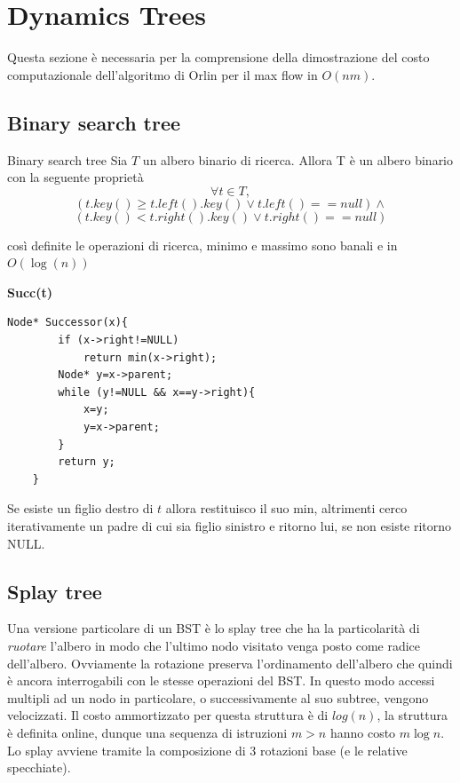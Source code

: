 \documentclass[a4paper, 11pt]{report}
\begin{document}
\section{Dynamics Trees}
    Questa sezione è necessaria per la comprensione della dimostrazione del costo computazionale dell'algoritmo di Orlin per il max flow in $O(nm)$.
    \subsection*{Binary search tree}
    \begin{definition}{Binary search tree}{}
        Sia $T$ un albero binario di ricerca.
        Allora T è un albero binario con la seguente proprietà
        \[\forall t \in T,\]\[ (t.key() \ge t.left().key() \lor t.left() == null)\land \]\[ (t.key() < t.right().key()\lor t.right() == null) \]
    \end{definition}
    così definite le operazioni di ricerca, minimo e massimo sono banali e in $O(\log(n))$
    
    \textbf{Succ(t)} 
    \begin{lstlisting}[style=customcpp]
    Node* Successor(x){ 
        if (x->right!=NULL) 
            return min(x->right); 
        Node* y=x->parent; 
        while (y!=NULL && x==y->right){ 
            x=y; 
            y=x->parent; 
        } 
        return y; 
    }
    \end{lstlisting}
    Se esiste un figlio destro di $t$ allora restituisco il suo min, altrimenti cerco iterativamente un padre di cui sia figlio sinistro e ritorno lui, se non esiste ritorno NULL.
    \subsection*{Splay tree}
    Una versione particolare di un BST è lo splay tree che ha la particolarità di \textit{ruotare} l'albero in modo che l'ultimo nodo visitato venga posto come radice dell'albero.
    Ovviamente la rotazione preserva l'ordinamento dell'albero che quindi è ancora interrogabili con le stesse operazioni del BST.
    In questo modo accessi multipli ad un nodo in particolare, o successivamente al suo subtree, vengono velocizzati. Il costo ammortizzato per questa struttura è di $log(n)$, la struttura è definita online, dunque una sequenza di istruzioni $m > n$ hanno costo $m\log n$.
    Lo splay avviene tramite la composizione di 3 rotazioni base (e le relative specchiate).
\end{document}
